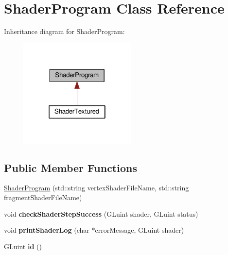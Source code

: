 \hypertarget{classShaderProgram}{}\section{Shader\+Program Class Reference}
\label{classShaderProgram}


Inheritance diagram for Shader\+Program\+:
\nopagebreak
\begin{figure}[H]
\begin{center}
\leavevmode
\includegraphics[width=166pt]{classShaderProgram__inherit__graph}
\end{center}
\end{figure}
\subsection*{Public Member Functions}
\begin{DoxyCompactItemize}
\item 
\hyperlink{classShaderProgram_a1ebd997652d664bb4cfad4327dfc0ebf}{Shader\+Program} (std\+::string vertex\+Shader\+File\+Name, std\+::string fragment\+Shader\+File\+Name)
\item 
\hypertarget{classShaderProgram_a266426e0200266b6776e8a5a8b1506b0}{}void {\bfseries check\+Shader\+Step\+Success} (G\+Luint shader, G\+Luint status)\label{classShaderProgram_a266426e0200266b6776e8a5a8b1506b0}

\item 
\hypertarget{classShaderProgram_ab9aaa0cdb43bd9de8a370e2869354a8a}{}void {\bfseries print\+Shader\+Log} (char $\ast$error\+Message, G\+Luint shader)\label{classShaderProgram_ab9aaa0cdb43bd9de8a370e2869354a8a}

\item 
\hypertarget{classShaderProgram_a190a33eec6ed3138a6d94a7305a9e831}{}G\+Luint {\bfseries id} ()\label{classShaderProgram_a190a33eec6ed3138a6d94a7305a9e831}

\end{DoxyCompactItemize}
